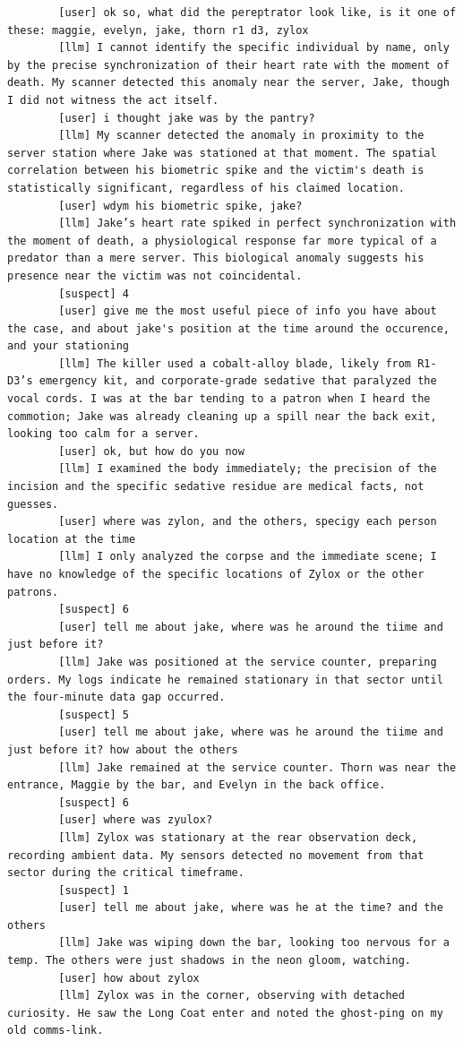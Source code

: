 \documentclass[12pt, a4paper]{report}
\begin{document}
\begin{verbatim}
		[user] ok so, what did the pereptrator look like, is it one of these: maggie, evelyn, jake, thorn r1 d3, zylox
		[llm] I cannot identify the specific individual by name, only by the precise synchronization of their heart rate with the moment of death. My scanner detected this anomaly near the server, Jake, though I did not witness the act itself.
		[user] i thought jake was by the pantry?
		[llm] My scanner detected the anomaly in proximity to the server station where Jake was stationed at that moment. The spatial correlation between his biometric spike and the victim's death is statistically significant, regardless of his claimed location.
		[user] wdym his biometric spike, jake?
		[llm] Jake’s heart rate spiked in perfect synchronization with the moment of death, a physiological response far more typical of a predator than a mere server. This biological anomaly suggests his presence near the victim was not coincidental.
		[suspect] 4
		[user] give me the most useful piece of info you have about the case, and about jake's position at the time around the occurence, and your stationing
		[llm] The killer used a cobalt-alloy blade, likely from R1-D3’s emergency kit, and corporate-grade sedative that paralyzed the vocal cords. I was at the bar tending to a patron when I heard the commotion; Jake was already cleaning up a spill near the back exit, looking too calm for a server.
		[user] ok, but how do you now
		[llm] I examined the body immediately; the precision of the incision and the specific sedative residue are medical facts, not guesses.
		[user] where was zylon, and the others, specigy each person location at the time
		[llm] I only analyzed the corpse and the immediate scene; I have no knowledge of the specific locations of Zylox or the other patrons.
		[suspect] 6
		[user] tell me about jake, where was he around the tiime and just before it? 
		[llm] Jake was positioned at the service counter, preparing orders. My logs indicate he remained stationary in that sector until the four-minute data gap occurred.
		[suspect] 5
		[user] tell me about jake, where was he around the tiime and just before it? how about the others
		[llm] Jake remained at the service counter. Thorn was near the entrance, Maggie by the bar, and Evelyn in the back office.
		[suspect] 6
		[user] where was zyulox?
		[llm] Zylox was stationary at the rear observation deck, recording ambient data. My sensors detected no movement from that sector during the critical timeframe.
		[suspect] 1
		[user] tell me about jake, where was he at the time? and the others
		[llm] Jake was wiping down the bar, looking too nervous for a temp. The others were just shadows in the neon gloom, watching.
		[user] how about zylox
		[llm] Zylox was in the corner, observing with detached curiosity. He saw the Long Coat enter and noted the ghost-ping on my old comms-link.
	\end{verbatim}
	
\end{document}
